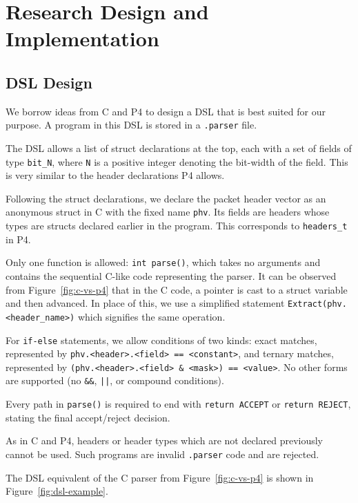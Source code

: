 \chapter{Research Design and Implementation}

\section{DSL Design}
\label{sec:dsl-design}

We borrow ideas from C and P4 to design a DSL that is best suited for our purpose. A program in this DSL is stored in a \texttt{.parser} file.

The DSL allows a list of struct declarations at the top, each with a set of fields of type \texttt{bit\_N}, where \texttt{N} is a positive integer denoting the bit-width of the field. This is very similar to the header declarations P4 allows.

Following the struct declarations, we declare the packet header vector as an anonymous struct in C with the fixed name \texttt{phv}. Its fields are headers whose types are structs declared earlier in the program. This corresponds to \texttt{headers\_t} in P4.

Only one function is allowed: \texttt{int parse()}, which takes no arguments and contains the sequential C-like code representing the parser. It can be observed from Figure~\ref{fig:c-vs-p4} that in the C code, a pointer is cast to a struct variable and then advanced. In place of this, we use a simplified statement \texttt{Extract(phv.<header\_name>)} which signifies the same operation.

For \texttt{if-else} statements, we allow conditions of two kinds: exact matches, represented by \texttt{phv.<header>.<field>~==~<constant>}, and ternary matches, represented by \texttt{(phv.<header>.<field>~\&~<mask>)~==~<value>}. No other forms are supported (no \texttt{\&\&}, \texttt{||}, or compound conditions).

Every path in \texttt{parse()} is required to end with \texttt{return ACCEPT} or \texttt{return REJECT}, stating the final accept/reject decision.

As in C and P4, headers or header types which are not declared previously cannot be used. Such programs are invalid \texttt{.parser} code and are rejected.

The DSL equivalent of the C parser from Figure~\ref{fig:c-vs-p4} is shown in Figure~\ref{fig:dsl-example}.

